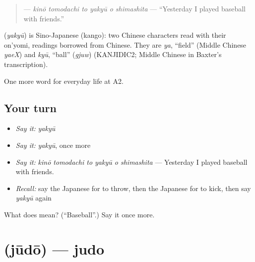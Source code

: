 \begin{quote}
\textbf{   } — \emph{kinō tomodachi to yakyū o shimashita} — \textquotedblleft{}Yesterday I played baseball with friends.\textquotedblright{}
\end{quote}

\begin{cousinweb}
\textbf{} (\emph{yakyū}) is Sino-Japanese (kango): two Chinese characters read with their on'yomi, readings borrowed from Chinese. They are \emph{ya}, \textquotedblleft{}field\textquotedblright{} (Middle Chinese \emph{yaeX}) and \emph{kyū}, \textquotedblleft{}ball\textquotedblright{} (\emph{gjuw}) (KANJIDIC2; Middle Chinese in Baxter's transcription).
\end{cousinweb}

\begin{grammarlens}[title={What you've built}]
One more word for everyday life at A2.
\end{grammarlens}

\subsection*{Your turn}
\begin{itemize}
\raggedright
  \item \emph{Say it:} \emph{yakyū}
  \item \emph{Say it:} \emph{yakyū}, once more
  \item \emph{Say it:} \emph{kinō tomodachi to yakyū o shimashita} — Yesterday I played baseball with friends.
  \item \emph{Recall:} say the Japanese for to throw, then the Japanese for to kick, then say \emph{yakyū} again
\end{itemize}

\begin{tcolorbox}[breakable,colback=teal!4,colframe=teal!35!black,title={Before you move on}]
What does  mean? (\textquotedblleft{}Baseball\textquotedblright{}.) Say it once more.
\end{tcolorbox}
\section[\texorpdfstring{\ja{じゅうどう} (jūdō)}{じゅうどう (jūdō)}]{ (jūdō) — judo}

\label{lesson:JA-C235-juudou}



